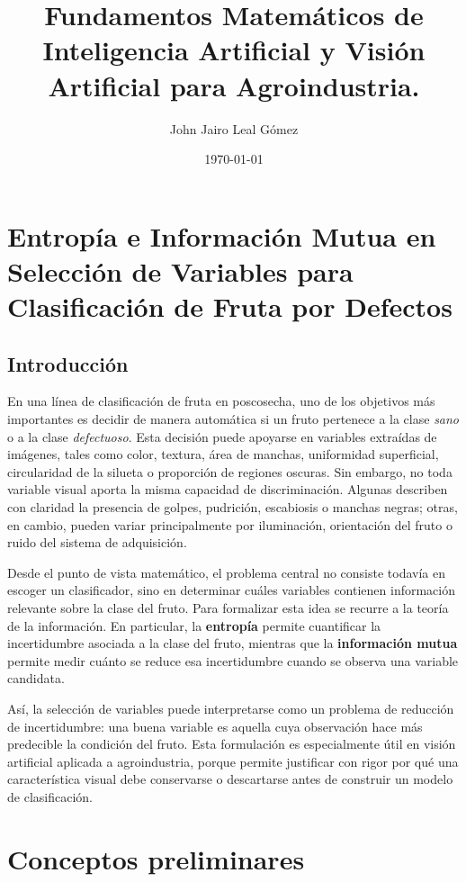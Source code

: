 \documentclass{article}
\title{Fundamentos Matemáticos de Inteligencia Artificial y Visión Artificial para Agroindustria.}
\author{John Jairo Leal Gómez}
\date{\today}
\begin{document}
\maketitle

\section{Entropía e Información Mutua en Selección de Variables para Clasificación de Fruta por Defectos}

\subsection{Introducción}

En una línea de clasificación de fruta en poscosecha, uno de los objetivos más importantes es decidir de manera automática si un fruto pertenece a la clase \textit{sano} o a la clase \textit{defectuoso}. Esta decisión puede apoyarse en variables extraídas de imágenes, tales como color, textura, área de manchas, uniformidad superficial, circularidad de la silueta o proporción de regiones oscuras. Sin embargo, no toda variable visual aporta la misma capacidad de discriminación. Algunas describen con claridad la presencia de golpes, pudrición, escabiosis o manchas negras; otras, en cambio, pueden variar principalmente por iluminación, orientación del fruto o ruido del sistema de adquisición.

Desde el punto de vista matemático, el problema central no consiste todavía en escoger un clasificador, sino en determinar cuáles variables contienen información relevante sobre la clase del fruto. Para formalizar esta idea se recurre a la teoría de la información. En particular, la \textbf{entropía} permite cuantificar la incertidumbre asociada a la clase del fruto, mientras que la \textbf{información mutua} permite medir cuánto se reduce esa incertidumbre cuando se observa una variable candidata.

Así, la selección de variables puede interpretarse como un problema de reducción de incertidumbre: una buena variable es aquella cuya observación hace más predecible la condición del fruto. Esta formulación es especialmente útil en visión artificial aplicada a agroindustria, porque permite justificar con rigor por qué una característica visual debe conservarse o descartarse antes de construir un modelo de clasificación.

\section{Conceptos preliminares}
\end{document}
